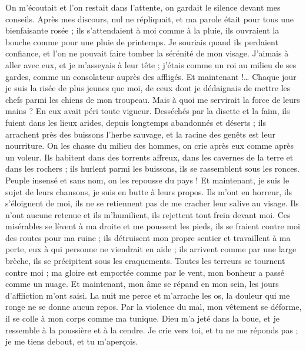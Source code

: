 \begin{multicols}{2}
On m'écoutait et l'on restait dans l'attente, on gardait le silence devant mes conseils.
Après mes discours, nul ne répliquait, et ma parole était pour tous une bienfaisante rosée ;
ils s'attendaient à moi comme à la pluie, ils ouvraient la bouche comme pour une pluie de printemps.
Je souriais quand ils perdaient confiance, et l'on ne pouvait faire tomber la sérénité de mon visage.
J'aimais à aller avec eux, et je m'asseyais à leur tête ; j'étais comme un roi au milieu de ses gardes, comme un consolateur auprès des affligés.
\VerseOne{}Et maintenant !… Chaque jour je suis la risée de plus jeunes que moi, de ceux dont je dédaignais de mettre les chefs parmi les chiens de mon troupeau.
Mais à quoi me servirait la force de leurs mains ? En eux avait péri toute vigueur.
Desséchés par la disette et la faim, ils fuient dans les lieux arides, depuis longtemps abandonnés et déserts ;
ils arrachent près des buissons l'herbe sauvage, et la racine des genêts est leur nourriture.
On les chasse du milieu des hommes, on crie après eux comme après un voleur.
Ils habitent dans des torrents affreux, dans les cavernes de la terre et dans les rochers ;
ils hurlent parmi les buissons, ils se rassemblent sous les ronces.
Peuple insensé et sans nom, on les repousse du pays !
Et maintenant, je suis le sujet de leurs chansons, je suis en butte à leurs propos.
Ils m'ont en horreur, ils s'éloignent de moi, ils ne se retiennent pas de me cracher leur salive au visage.
Ils n'ont aucune retenue et ils m'humilient, ils rejettent tout frein devant moi.
Ces misérables se lèvent à ma droite et me poussent les pieds, ils se fraient contre moi des routes pour ma ruine ;
ils détruisent mon propre sentier et travaillent à ma perte, eux à qui personne ne viendrait en aide ;
ils arrivent comme par une large brèche, ils se précipitent sous les craquements.
Toutes les terreurs se tournent contre moi ; ma gloire est emportée comme par le vent, mon bonheur a passé comme un nuage.
Et maintenant, mon âme se répand en mon sein, les jours d'affliction m'ont saisi.
La nuit me perce et m'arrache les os, la douleur qui me ronge ne se donne aucun repos.
Par la violence du mal, mon vêtement se déforme, il se colle à mon corps comme ma tunique.
Dieu m'a jeté dans la boue, et je ressemble à la poussière et à la cendre.
Je crie vers toi, et tu ne me réponds pas ; je me tiens debout, et tu m'aperçois.

\end{multicols}
